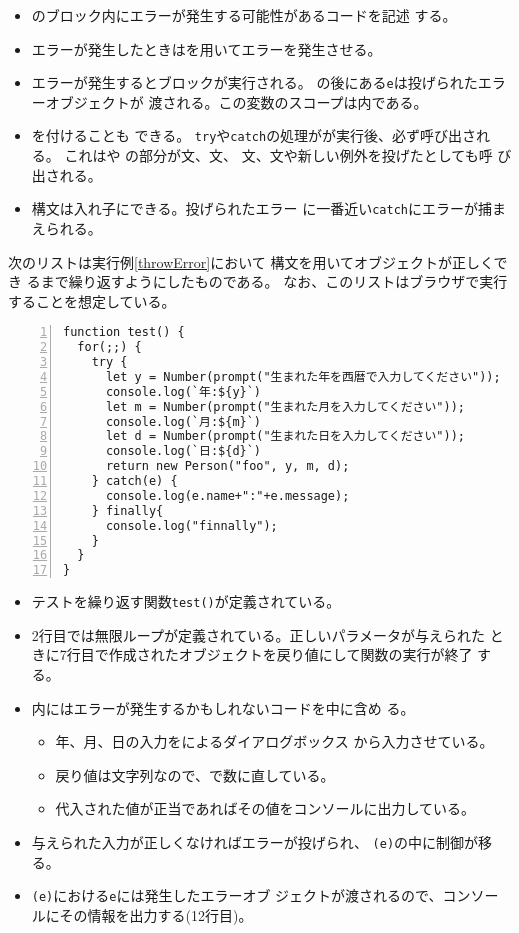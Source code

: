 \begin{itemize}
 \item {}のブロック内にエラーが発生する可能性があるコードを記述
       する。
 \item エラーが発生したときはを用いてエラーを発生させる。
 \item エラーが発生するとブロックが実行される。
       の後にある\texttt{e}は投げられたエラーオブジェクトが
       渡される。この変数のスコープは内である。
 \item {}を付けることも
       できる。%
       \texttt{try}や\texttt{catch}の処理がが実行後、必ず呼び出される。
       これはや
       の部分が文、文、
       文、文や新しい例外を投げたとしても呼
       び出される。
 \item {}構文は入れ子にできる。投げられたエラー
			 に一番近い\texttt{catch}にエラーが捕まえられる。
\end{itemize}
 \begin{Exec}\upshape
	次のリストは実行例\ref{throwError}において
  構文を用いてオブジェクトが正しくでき
	るまで繰り返すようにしたものである。
 なお、このリストはブラウザで実行することを想定している。
 \end{Exec}
\begin{Verbatim}[numbers=left]
function test() {
  for(;;) {
    try {
      let y = Number(prompt("生まれた年を西暦で入力してください"));
      console.log(`年:${y}`)
      let m = Number(prompt("生まれた月を入力してください"));
      console.log(`月:${m}`)
      let d = Number(prompt("生まれた日を入力してください"));
      console.log(`日:${d}`)
      return new Person("foo", y, m, d);
    } catch(e) {
      console.log(e.name+":"+e.message);
    } finally{
      console.log("finnally");
    }
  }
}
\end{Verbatim}
\begin{itemize}
 \item テストを繰り返す関数\texttt{test()}が定義されている。
 \item 2行目では無限ループが定義されている。正しいパラメータが与えられた
			 ときに7行目で作成されたオブジェクトを戻り値にして関数の実行が終了
			 する。
 \item {}内にはエラーが発生するかもしれないコードを中に含め
			 る。
	\begin{itemize}
	 \item 年、月、日の入力をによるダイアログボックス
				 から入力させている。
	 \item 戻り値は文字列なので、で数に直している。
   \item 代入された値が正当であればその値をコンソールに出力している。
	\end{itemize}
 \item 与えられた入力が正しくなければエラーが投げられ、
			 \texttt{(e)}の中に制御が移る。
 \item {}\texttt{(e)}における\texttt{e}には発生したエラーオブ
			 ジェクトが渡されるので、コンソールにその情報を出力する(12行目)。
\end{itemize}
